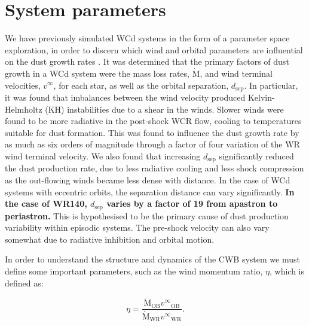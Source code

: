 \documentclass[fleqn,usenatbib]{mnras}
\newcommand{\swr}{\ensuremath{_{\text{WR}}}}
\newcommand{\sob}{\ensuremath{_{\text{OB}}}}
\newcommand{\rms}[1]{\ensuremath{_{\text{#1}}}}
\newcommand{\mdot}{\dot{\text{M}}}
\newcommand{\dsep}{d\rms{sep}}
\begin{document}
\section{System parameters}
\label{sec:paper2-wr140}

We have previously simulated WCd systems in the form of a parameter space exploration, in order to discern which wind and orbital parameters are influential on the dust growth rates \citep{eatsonExplorationDustGrain2022}.
It was determined that the primary factors of dust growth in a WCd system were the mass loss rates, $\mdot$, and wind terminal velocities, $v^\infty$, for each star, as well as the orbital separation, $d\rms{sep}$.
In particular, it was found that imbalances between the wind velocity produced Kelvin-Helmholtz (KH) instabilities due to a shear in the winds.
Slower winds were found to be more radiative in the post-shock WCR flow, cooling to temperatures suitable for dust formation.
This was found to influence the dust growth rate by as much as six orders of magnitude through a factor of four variation of the WR wind terminal velocity.
We also found that increasing $d\rms{sep}$ significantly reduced the dust production rate, due to less radiative cooling and less shock compression as the out-flowing winds became less dense with distance.
In the case of WCd systems with eccentric orbits, the separation distance can vary significantly.
\textbf{In the case of WR140, $\dsep$ varies by a factor of 19 from apastron to periastron.}
This is hypothesised to be the primary cause of dust production variability within episodic systems.
The pre-shock velocity can also vary somewhat due to radiative inhibition and orbital motion.

In order to understand the structure and dynamics of the CWB system we must define some important parameters, such as the wind momentum ratio, $\eta$, which is defined as:

\begin{equation}
  \eta = \frac{\mdot\sob v^\infty\sob}{\mdot\swr v^\infty\swr} .
\end{equation}
\end{document}
